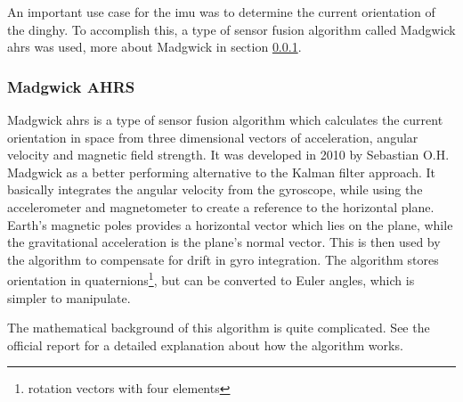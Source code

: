 An important use case for the \gls{imu} was to determine the current orientation of the dinghy. To accomplish this, a type of sensor fusion algorithm called Madgwick \gls{ahrs} was used, more about Madgwick in section \ref{sec:madgwick}.

\subsubsection{Madgwick AHRS}
\label{sec:madgwick}
Madgwick \gls{ahrs} is a type of sensor fusion algorithm which calculates the current orientation in space from three dimensional vectors of acceleration, angular velocity and magnetic field strength. It was developed in 2010 by Sebastian O.H. Madgwick as a better performing alternative to the Kalman filter approach\cite{madgwick}. It basically integrates the angular velocity from the gyroscope, while using the accelerometer and magnetometer to create a reference to the horizontal plane. Earth’s magnetic poles provides a horizontal vector which lies on the plane, while the gravitational acceleration is the plane’s normal vector. This is then used by the algorithm to compensate for drift in gyro integration. The algorithm stores orientation in quaternions\footnote{rotation vectors with four elements}, but can be converted to Euler angles, which is simpler to manipulate.

The mathematical background of this algorithm is quite complicated. See the official report\cite{madgwick-report} for a detailed explanation about how the algorithm works.


